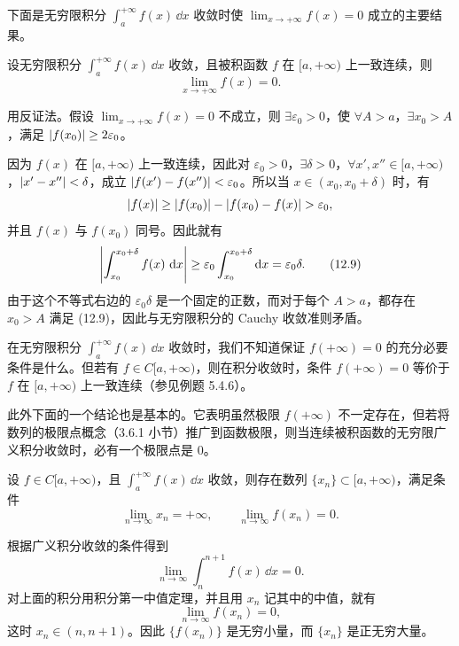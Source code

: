 下面是无穷限积分 $\int_a^{+\infty}f(x)\,\dd x$ 收敛时使 $\lim_{x\to+\infty}f(x)=0$ 成立的主要结果。

\begin{xproposition}[12.4.1]
设无穷限积分 $\int_a^{+\infty}f(x)\,\dd x$ 收敛，且被积函数 $f$ 在 $[a,+\infty)$ 上一致连续，则
\[
  \lim_{x\to+\infty}f(x)=0.
\]
\end{xproposition}
\begin{xproof}
用反证法。假设 $\lim_{x\to+\infty}f(x)=0$ 不成立，则 $\exists\varepsilon_0>0$，使 $\forall A>a$，$\exists x_0>A$，满足 $\abs{f(x_0)}\geq2\varepsilon_0$。

因为 $f(x)$ 在 $[a,+\infty)$ 上一致连续，因此对 $\varepsilon_0>0$，$\exists\delta>0$，$\forall x',x''\in[a,+\infty)$，$\abs{x'-x''}<\delta$，成立 $\abs{f(x')-f(x'')}<\varepsilon_0$。所以当 $x\in(x_0,x_0+\delta)$ 时，有
\[
  \abs{f(x)}\geq\abs{f(x_0)}-\abs{f(x_0)-f(x)}>\varepsilon_0,
\]
并且 $f(x)$ 与 $f(x_0)$ 同号。因此就有
\begin{equation}
  \abs*{\int_{x_0}^{x_0+\delta}f(x)\,\dd x}
  \geq\varepsilon_0\int_{x_0}^{x_0+\delta}\dd x
  =\varepsilon_0\delta.
  \tag{12.9}
  \label{eq:12.9}
\end{equation}
由于这个不等式右边的 $\varepsilon_0\delta$ 是一个固定的正数，而对于每个 $A>a$，都存在 $x_0>A$ 满足 (12.9)，因此与无穷限积分的 Cauchy 收敛准则矛盾。
\end{xproof}

\begin{xremark}
在无穷限积分 $\int_a^{+\infty}f(x)\,\dd x$ 收敛时，我们不知道保证 $f(+\infty)=0$ 的充分必要条件是什么。但若有 $f\in C[a,+\infty)$，则在积分收敛时，条件 $f(+\infty)=0$ 等价于 $f$ 在 $[a,+\infty)$ 上一致连续（参见例题 5.4.6）。

此外下面的一个结论也是基本的。它表明虽然极限 $f(+\infty)$ 不一定存在，但若将数列的极限点概念（3.6.1 小节）推广到函数极限，则当连续被积函数的无穷限广义积分收敛时，必有一个极限点是 0。
\end{xremark}

\begin{xexample}[12.4.3]
设 $f\in C[a,+\infty)$，且 $\int_a^{+\infty}f(x)\,\dd x$ 收敛，则存在数列 $\{x_n\}\subset[a,+\infty)$，满足条件
\[
  \lim_{n\to\infty}x_n=+\infty,\qquad
  \lim_{n\to\infty}f(x_n)=0.
\]
\end{xexample}
\begin{xproof}
根据广义积分收敛的条件得到
\[
  \lim_{n\to\infty}\int_n^{n+1}f(x)\,\dd x=0.
\]
对上面的积分用积分第一中值定理，并且用 $x_n$ 记其中的中值，就有
\[
  \lim_{n\to\infty}f(x_n)=0,
\]
这时 $x_n\in(n,n+1)$。因此 $\{f(x_n)\}$ 是无穷小量，而 $\{x_n\}$ 是正无穷大量。
\end{xproof}

